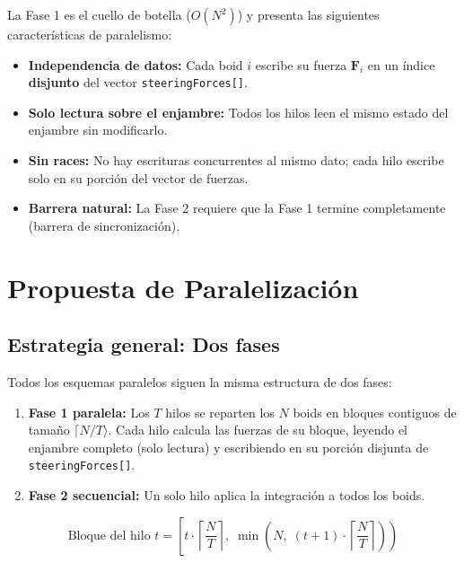 \documentclass[11pt,a4paper]{article}
\begin{document}
La Fase 1 es el cuello de botella ($O(N^2)$) y presenta las siguientes características de paralelismo:

\begin{itemize}
  \item \textbf{Independencia de datos:} Cada boid $i$ escribe su fuerza $\mathbf{F}_i$ en un índice \textbf{disjunto} del vector \texttt{steeringForces[]}.
  \item \textbf{Solo lectura sobre el enjambre:} Todos los hilos leen el mismo estado del enjambre sin modificarlo.
  \item \textbf{Sin races:} No hay escrituras concurrentes al mismo dato; cada hilo escribe solo en su porción del vector de fuerzas.
  \item \textbf{Barrera natural:} La Fase 2 requiere que la Fase 1 termine completamente (barrera de sincronización).
\end{itemize}

\section{Propuesta de Paralelización}
\label{sec:paralelismo}

\subsection{Estrategia general: Dos fases}

Todos los esquemas paralelos siguen la misma estructura de dos fases:

\begin{enumerate}
  \item \textbf{Fase 1 paralela:} Los $T$ hilos se reparten los $N$ boids en bloques contiguos de tamaño $\lceil N/T \rangle$. Cada hilo calcula las fuerzas de su bloque, leyendo el enjambre completo (solo lectura) y escribiendo en su porción disjunta de \texttt{steeringForces[]}.
  \item \textbf{Fase 2 secuencial:} Un solo hilo aplica la integración a todos los boids.
\end{enumerate}

\begin{equation}
  \text{Bloque del hilo } t = \left[t \cdot \left\lceil \frac{N}{T} \right\rceil, \; \min\left(N, \; (t+1) \cdot \left\lceil \frac{N}{T} \right\rceil\right)\right)
  \label{eq:particion}
\end{equation}
\end{document}
